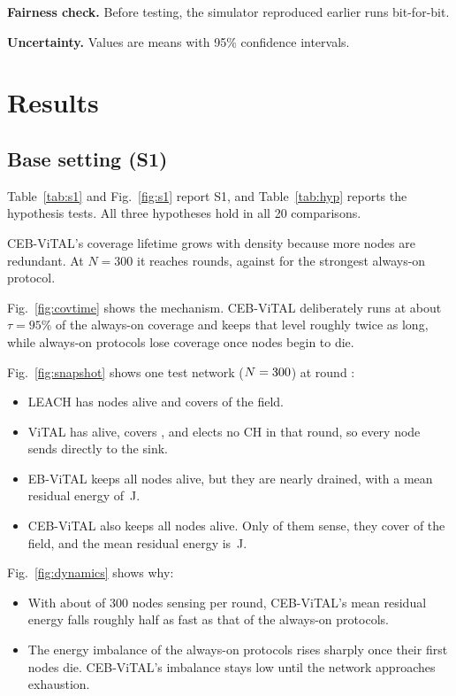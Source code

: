 \documentclass[journal]{IEEEtran}
\begin{document}
\textbf{Fairness check.} Before testing, the simulator reproduced \NFair{} earlier runs bit-for-bit.

\textbf{Uncertainty.} Values are means with 95\% confidence intervals.

\section{Results}\label{sec:results}
\subsection{Base setting (S1)}
Table~\ref{tab:s1} and Fig.~\ref{fig:s1} report S1, and Table~\ref{tab:hyp} reports the hypothesis tests. All three hypotheses hold in all 20 comparisons.

CEB-ViTAL's coverage lifetime grows with density because more nodes are redundant. At $N=300$ it reaches \TcebThree{} rounds, against \TbestThree{} for the strongest always-on protocol.

Fig.~\ref{fig:covtime} shows the mechanism. CEB-ViTAL deliberately runs at about $\tau=95\%$ of the always-on coverage and keeps that level roughly twice as long, while always-on protocols lose coverage once nodes begin to die.

Fig.~\ref{fig:snapshot} shows one test network ($N=300{}$) at round \SnapRound{}:
\begin{itemize}
\item LEACH has \SnapLeachAlive{} nodes alive and covers \SnapLeachCov{} of the field.
\item ViTAL has \SnapVitalAlive{} alive, covers \SnapVitalCov{}, and elects no CH in that round, so every node sends directly to the sink.
\item EB-ViTAL keeps all \SnapEbAlive{} nodes alive, but they are nearly drained, with a mean residual energy of \SnapEbE{}\,J.
\item CEB-ViTAL also keeps all \SnapCebAlive{} nodes alive. Only \SnapCebSensing{} of them sense, they cover \SnapCebCov{} of the field, and the mean residual energy is \SnapCebE{}\,J.
\end{itemize}

Fig.~\ref{fig:dynamics} shows why:
\begin{itemize}
\item With about \SensCeb{} of 300 nodes sensing per round, CEB-ViTAL's mean residual energy falls roughly half as fast as that of the always-on protocols.
\item The energy imbalance of the always-on protocols rises sharply once their first nodes die. CEB-ViTAL's imbalance stays low until the network approaches exhaustion.
\end{itemize}
\end{document}
